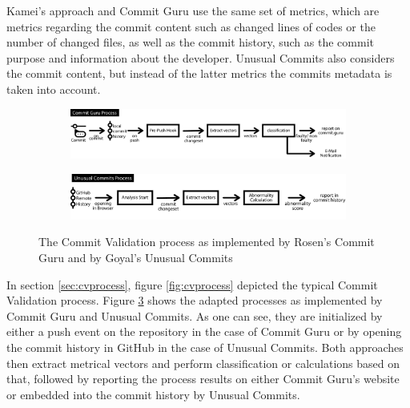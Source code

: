 Kamei's approach and Commit Guru use the same set of metrics, which are metrics regarding the commit content such as changed lines of codes or the number of changed files, as well as the commit history, such as the commit purpose and information about the developer. Unusual Commits also considers the commit content, but instead of the latter metrics the commits metadata is taken into account.

\begin{figure}[t]
	\centering
	
	\begin{subfigure}[t]{\textwidth}
		\includegraphics[width=\textwidth]{images/commitvalidation-process/commitguruprocess-pdf}
		\label{fig:cvprocess-commitguru}
	\end{subfigure}
	
	\begin{subfigure}[t]{\textwidth}
		\includegraphics[width=\textwidth]{images/commitvalidation-process/unusualcommitsprocess-pdf}
		\label{fig:cvprocess-unusual}
	\end{subfigure}
	\caption{The Commit Validation process as implemented by Rosen's Commit Guru \cite{Rosen2015} and by Goyal's Unusual Commits \cite{Goyal2017}}
	\label{fig:cvprocess-guru-unusual}
\end{figure}

In section \ref{sec:cvprocess}, figure \ref{fig:cvprocess} depicted the typical Commit Validation process. Figure \ref{fig:cvprocess-guru-unusual} shows the adapted processes as implemented by Commit Guru and Unusual Commits. As one can see, they are initialized by either a push event on the repository in the case of Commit Guru or by opening the commit history in GitHub in the case of Unusual Commits. Both approaches then extract metrical vectors and perform classification or calculations based on that, followed by reporting the process results on either Commit Guru's website or embedded into the commit history by Unusual Commits.

